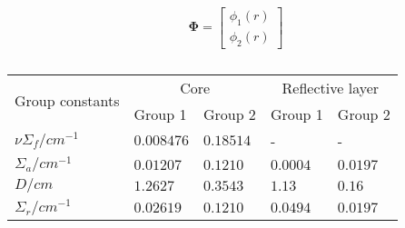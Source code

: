 \begin{equation}
    \pmb{\Phi} = \begin{bmatrix}
        \phi_1(r) \\
        \phi_2(r)
    \end{bmatrix}
\end{equation}

\begin{table}[H]
    \centering
    \caption{}
    \label{tab:}
    \begin{tabular}{lllll}    \toprule
    \multirow{2}{*}{Group constants} & \multicolumn{2}{c}{Core} & \multicolumn{2}{c}{Reflective layer} \\
    \cmidrule(lr){2-3}\cmidrule(lr){4-5}
     & Group 1 & Group 2 & Group 1 & Group 2 \\
    \midrule
    $\nu\Sigma_f/\si{cm^{-1}}$ & $0.008476$ & $0.18514$ & - & - \\
    $\Sigma_a/\si{cm^{-1}}$ & $0.01207$ & $0.1210$ & $0.0004$ & $0.0197$ \\
    $D/\si{cm}$ & $1.2627$ & $0.3543$ & $1.13$ & $0.16$ \\
    $\Sigma_r/\si{cm^{-1}}$ & $0.02619$ & $0.1210$ & $0.0494$ & $0.0197$ \\
    \bottomrule
    \end{tabular}
\end{table}
